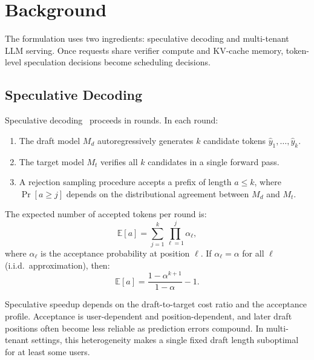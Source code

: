 \documentclass[journal]{IEEEtran}
\begin{document}
\section{Background}
\label{sec:background}

The formulation uses two ingredients: speculative decoding and
multi-tenant LLM serving. Once requests share verifier compute and
KV-cache memory, token-level speculation decisions become scheduling
decisions.

\subsection{Speculative Decoding}
\label{sec:bg-specdecode}

Speculative decoding~\cite{leviathan2023fast, 
chen2023accelerating} proceeds in rounds. In each round:

\begin{enumerate}
    \item The draft model $M_d$ autoregressively 
    generates $k$ candidate tokens 
    $\hat{y}_1, \ldots, \hat{y}_k$.
    
    \item The target model $M_t$ verifies all 
    $k$ candidates in a single forward pass.
    
    \item A rejection sampling procedure accepts a 
    prefix of length $a \leq k$, where 
    $\Pr[a \geq j]$ depends on the distributional 
    agreement between $M_d$ and $M_t$.
\end{enumerate}

The expected number of accepted tokens per round is:
\begin{equation}
    \label{eq:expected-accepted}
    \mathbb{E}[a] = \sum_{j=1}^{k} 
    \prod_{\ell=1}^{j} \alpha_\ell,
\end{equation}
where $\alpha_\ell$ is the acceptance probability at 
position $\ell$. If $\alpha_\ell = \alpha$ for all $\ell$ (i.i.d.\ 
approximation), then:
\begin{equation}
    \label{eq:iid-accepted}
    \mathbb{E}[a] = \frac{1 - \alpha^{k+1}}{1 - \alpha} 
    - 1.
\end{equation}

Speculative speedup depends on the draft-to-target cost ratio and
the acceptance profile. Acceptance is user-dependent and
position-dependent, and later draft positions often become less
reliable as prediction errors compound. In multi-tenant settings, this
heterogeneity makes a single fixed draft length suboptimal for at least
some users.
\end{document}
